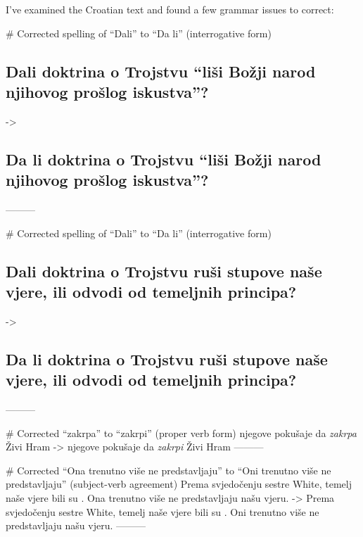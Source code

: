 I've examined the Croatian text and found a few grammar issues to correct:

# Corrected spelling of “Dali” to “Da li” (interrogative form)
\subsection*{Dali doktrina o Trojstvu “liši Božji narod njihovog prošlog iskustva”?}
->
\subsection*{Da li doktrina o Trojstvu “liši Božji narod njihovog prošlog iskustva”?}
---------

# Corrected spelling of “Dali” to “Da li” (interrogative form)
\subsection*{Dali doktrina o Trojstvu ruši stupove naše vjere, ili odvodi od temeljnih principa?}
->
\subsection*{Da li doktrina o Trojstvu ruši stupove naše vjere, ili odvodi od temeljnih principa?}
---------

# Corrected “zakrpa” to “zakrpi” (proper verb form)
njegove pokušaje da \textit{zakrpa} Živi Hram
->
njegove pokušaje da \textit{zakrpi} Živi Hram
---------

# Corrected “Ona trenutno više ne predstavljaju” to “Oni trenutno više ne predstavljaju” (subject-verb agreement)
Prema svjedočenju sestre White, temelj naše vjere bili su . Ona trenutno više ne predstavljaju našu vjeru.
->
Prema svjedočenju sestre White, temelj naše vjere bili su . Oni trenutno više ne predstavljaju našu vjeru.
---------